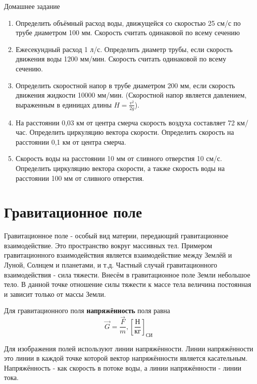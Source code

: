 \documentclass[a6paper, 11pt]{diss_4}
\renewcommand{\'}{\,'}
\begin{document}
\begin{center}
   Домашнее задание
\end{center}
\begin{enumerate}
\item Определить объёмный расход воды, движущейся со
скоростью 25 см/с по трубе диаметром 100 мм. Скорость
считать одинаковой по всему сечению

\item Ежесекундный расход 1 л/с. Определить диаметр трубы,
если скорость движения воды 1200 мм/мин. Скорость считать
одинаковой по всему сечению.

\item Определить скоростной напор в трубе диаметром 200 мм,
если скорость движения жидкости 10000 мм/мин. (Скоростной напор
является давлением, выраженным в единицах длины $H=\frac{v^2}{2g}$).

\item На расстоянии 0,03 км от центра смерча скорость воздуха
составляет 72 км/час. Определить циркуляцию вектора скорости.
Определить скорость на расстоянии 0,1 км от центра смерча.

\item Скорость воды на расстоянии 10 мм от сливного отверстия
10 см/с. Определить циркуляцию вектора скорости, а также скорость воды на
 расстоянии 100 мм от сливного отверстия.
\end{enumerate}


\section{Гравитационное поле}

  Гравитационное поле - особый вид материи, передающий гравитационное
взаимодействие. Это пространство вокруг массивных тел. Примером гравитационного
взаимодействия является взаимодействие между Землёй и Луной, Солнцем и
планетами, и т.д. Частный случай гравитационного взаимодействия - сила тяжести.
Внесём в гравитационное поле Земли небольшое тело. В данной точке отношение
силы тяжести к массе тела величина постоянная и зависит только от массы Земли.

Для гравитационного поля \textbf{напряжённость} поля равна
\[
\vec{G}=\frac{\vec{F}}{m},{\left[\frac{Н}{кг}\right]}_{СИ}
\]

  Для изображения полей используют линии напряжённости. Линии напряжённости
это линии в каждой точке которой вектор напряжённости является касательным.
Напряжённость - как скорость в потоке воды, а линии напряжённости - линии тока.
\end{document}
